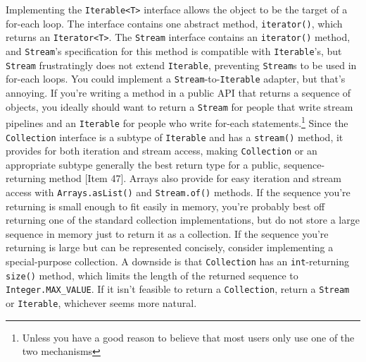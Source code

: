 \documentclass[8pt, table, xcdraw]{article}%
\begin{document}
Implementing the \lstinline{Iterable<T>} interface allows the object to be the target of a for-each loop. The interface contains one abstract method, \lstinline{iterator()}, which returns an \lstinline{Iterator<T>}. The \lstinline{Stream} interface contains an \lstinline{iterator()} method, and \lstinline{Stream}’s specification for this method is compatible with \lstinline{Iterable}’s, but \lstinline{Stream} frustratingly does not extend \lstinline{Iterable}, preventing \lstinline{Stream}s to be used in for-each loops. You could implement a \lstinline{Stream}-to-\lstinline{Iterable} adapter, but that's annoying. If you’re writing a method in a public API that returns a sequence of objects, you ideally should want to return a \lstinline{Stream} for people that write stream pipelines and an \lstinline{Iterable} for people who write for-each statements.\footnote{Unless you have a good reason to believe that most users only use one of the two mechanisms} Since the \lstinline{Collection} interface is a subtype of \lstinline{Iterable} and has a \lstinline{stream()} method, it provides for both iteration and stream access, making \lstinline{Collection} or an appropriate subtype generally the best return type for a public, sequence-returning method [Item 47]. Arrays also provide for easy iteration and stream access with \lstinline{Arrays.asList()} and \lstinline{Stream.of()} methods. If the sequence you’re returning is small enough to fit easily in memory, you’re probably best off returning one of the standard collection implementations, but do not store a large sequence in memory just to return it as a collection. If the sequence you’re returning is large but can be represented concisely, consider implementing a special-purpose collection. A downside is that \lstinline{Collection} has an \lstinline{int}-returning \lstinline{size()} method, which limits the length of the returned sequence to \lstinline{Integer.MAX_VALUE}. If it isn’t feasible to return a \lstinline{Collection}, return a \lstinline{Stream} or \lstinline{Iterable}, whichever seems more natural.
\end{document}
